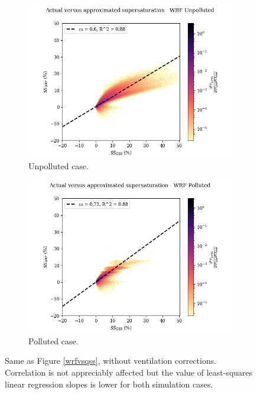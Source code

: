 \documentclass{article}
\begin{document}
\begin{figure}[ht]
	\centering
	\begin{subfigure}{0.7\textwidth}
		\includegraphics[width=\textwidth]{revmywrf/v12_FINAL_heatmap_ss_qss_vs_ss_wrf_Unpolluted_figure.png}
		\caption{Unpolluted case.}
		\label{wrfvsqssunpollv12}
	\end{subfigure}
	\begin{subfigure}{0.7\textwidth}
		\includegraphics[width=\textwidth]{revmywrf/v12_FINAL_heatmap_ss_qss_vs_ss_wrf_Polluted_figure.png}
		\caption{Polluted case.}
		\label{wrfvsqsspollv12}
	\end{subfigure}
	\caption{Same as Figure \ref{wrfvsqss}, without ventilation corrections. Correlation is not appreciably affected but the value of least-squares linear regression slopes is lower for both simulation cases.}
	\label{wrfvsqssv12}
\end{figure}
\end{document}

